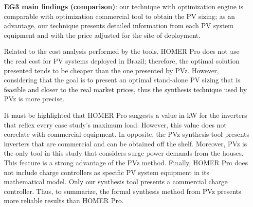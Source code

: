 \documentclass[a4paper,donotrepeattitle,fleqn]{cas-dc}
\begin{document}
\begin{tcolorbox}
\textbf{EG3 main findings (comparison)}: our technique with optimization engine is comparable with optimization commercial tool to obtain the PV  sizing; as an advantage, our technique presents detailed information from each PV system equipment and with the price adjusted for the site of deployment.
\end{tcolorbox}

Related to the cost analysis performed by the tools, HOMER Pro does not use the real cost for PV systems deployed in Brazil; therefore, the optimal solution presented tends to be cheaper than the one presented by PVz. However, considering that the goal is to present an optimal stand-alone PV sizing that is feasible and closer to the real market prices, thus the synthesis technique used by PVz is more precise.

It must be highlighted that HOMER Pro suggests a value in kW for the inverters that reflex every case study's maximum load. However, this value does not correlate with commercial equipment. In opposite, the PVz synthesis tool presents inverters that are commercial and can be obtained off the shelf. Moreover, PVz is the only tool in this study that considers surge power demands from the houses. This feature is a strong advantage of the PVz method. Finally, HOMER Pro does not include charge controllers as specific PV system equipment in its mathematical model. Only our synthesis tool presents a commercial charge controller. Thus, to summarize, the formal synthesis method from PVz presents more reliable results than HOMER Pro.
\end{document}
